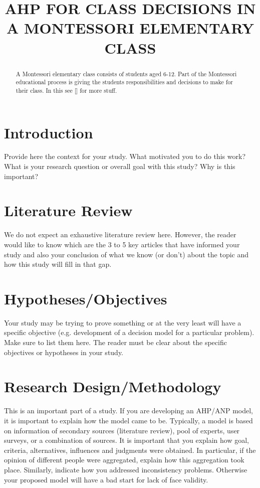 \documentclass[11pt]{article}
\title{AHP FOR CLASS DECISIONS IN A MONTESSORI ELEMENTARY CLASS}
\renewcommand{\maketitle}{\begin{center}{\Large \textbf{\thetitle}} \end{center}}
\begin{document}
\maketitle
\thispagestyle{fancy}
\begin{abstract}
A Montessori elementary class consists of students aged 6-12.  Part of the Montessori educational
process is giving the students responsibilities and decisions to make for their class.  In this see [\cite{1:200}] for more stuff.
\end{abstract}

\section{Introduction}
Provide here the context for your study. What motivated you to do this work? What is your research question or overall goal with this study? Why is this important? 

\section{Literature Review}
We do not expect an exhaustive literature review here. However, the reader would like to know which are the 3 to 5 key articles that have informed your study and also your conclusion of what we know (or don’t) about the topic and how this study will fill in that gap. 

\section{Hypotheses/Objectives}
Your study may be trying to prove something or at the very least will have a specific objective (e.g. development of a decision model for a particular problem). Make sure to list them here. The reader must be clear about the specific objectives or hypotheses in your study. 

\section{Research Design/Methodology}
This is an important part of a study. If you are developing an AHP/ANP model, it is important to explain how the model came to be. Typically, a model is based on information of secondary sources (literature review), pool of experts, user surveys, or a combination of sources. It is important that you explain how goal, criteria, alternatives, influences and judgments were obtained. In particular, if the opinion of different people were aggregated, explain how this aggregation took place. Similarly, indicate how you addressed inconsistency problems. Otherwise your proposed model will have a bad start for lack of face validity.
\end{document}
